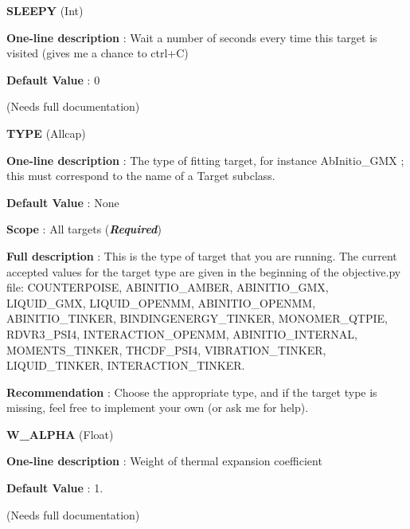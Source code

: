 \begin{DoxyItemize}
\item {\bfseries  S\-L\-E\-E\-P\-Y } (Int) \par
{\bfseries  One-\/line description }\-: Wait a number of seconds every time this target is visited (gives me a chance to ctrl+\-C) \par
{\bfseries  Default Value }\-: 0 \par
(Needs full documentation)\end{DoxyItemize}
\begin{DoxyItemize}
\item {\bfseries  T\-Y\-P\-E } (Allcap) \par
{\bfseries  One-\/line description }\-: The type of fitting target, for instance Ab\-Initio\-\_\-\-G\-M\-X ; this must correspond to the name of a Target subclass. \par
{\bfseries  Default Value }\-: None \par
{\bfseries  Scope }\-: All targets ({\bfseries {\itshape Required}}) \par
{\bfseries  Full description }\-: This is the type of target that you are running. The current accepted values for the target type are given in the beginning of the objective.\-py file\-: C\-O\-U\-N\-T\-E\-R\-P\-O\-I\-S\-E, A\-B\-I\-N\-I\-T\-I\-O\-\_\-\-A\-M\-B\-E\-R, A\-B\-I\-N\-I\-T\-I\-O\-\_\-\-G\-M\-X, L\-I\-Q\-U\-I\-D\-\_\-\-G\-M\-X, L\-I\-Q\-U\-I\-D\-\_\-\-O\-P\-E\-N\-M\-M, A\-B\-I\-N\-I\-T\-I\-O\-\_\-\-O\-P\-E\-N\-M\-M, A\-B\-I\-N\-I\-T\-I\-O\-\_\-\-T\-I\-N\-K\-E\-R, B\-I\-N\-D\-I\-N\-G\-E\-N\-E\-R\-G\-Y\-\_\-\-T\-I\-N\-K\-E\-R, M\-O\-N\-O\-M\-E\-R\-\_\-\-Q\-T\-P\-I\-E, R\-D\-V\-R3\-\_\-\-P\-S\-I4, I\-N\-T\-E\-R\-A\-C\-T\-I\-O\-N\-\_\-\-O\-P\-E\-N\-M\-M, A\-B\-I\-N\-I\-T\-I\-O\-\_\-\-I\-N\-T\-E\-R\-N\-A\-L, M\-O\-M\-E\-N\-T\-S\-\_\-\-T\-I\-N\-K\-E\-R, T\-H\-C\-D\-F\-\_\-\-P\-S\-I4, V\-I\-B\-R\-A\-T\-I\-O\-N\-\_\-\-T\-I\-N\-K\-E\-R, L\-I\-Q\-U\-I\-D\-\_\-\-T\-I\-N\-K\-E\-R, I\-N\-T\-E\-R\-A\-C\-T\-I\-O\-N\-\_\-\-T\-I\-N\-K\-E\-R. \par
{\bfseries  Recommendation }\-: Choose the appropriate type, and if the target type is missing, feel free to implement your own (or ask me for help).\end{DoxyItemize}
\begin{DoxyItemize}
\item {\bfseries  W\-\_\-\-A\-L\-P\-H\-A } (Float) \par
{\bfseries  One-\/line description }\-: Weight of thermal expansion coefficient \par
{\bfseries  Default Value }\-: 1. \par
(Needs full documentation)\end{DoxyItemize}
